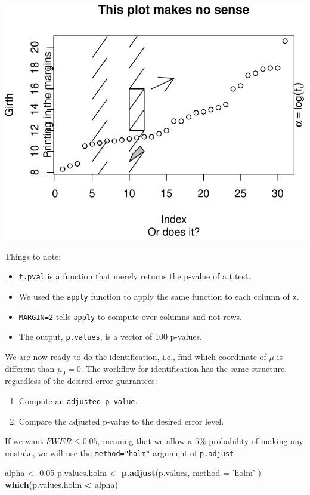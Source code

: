 \documentclass[]{book}
\newenvironment{Shaded}{\begin{snugshade}}{\end{snugshade}}
\newcommand{\KeywordTok}[1]{\textcolor[rgb]{0.13,0.29,0.53}{\textbf{#1}}}
\newcommand{\DataTypeTok}[1]{\textcolor[rgb]{0.13,0.29,0.53}{#1}}
\newcommand{\FloatTok}[1]{\textcolor[rgb]{0.00,0.00,0.81}{#1}}
\newcommand{\StringTok}[1]{\textcolor[rgb]{0.31,0.60,0.02}{#1}}
\newcommand{\OperatorTok}[1]{\textcolor[rgb]{0.81,0.36,0.00}{\textbf{#1}}}
\newcommand{\NormalTok}[1]{#1}
\providecommand{\tightlist}{%
  \setlength{\itemsep}{0pt}\setlength{\parskip}{0pt}}
\theoremstyle{definition}
\theoremstyle{definition}
\theoremstyle{definition}
\theoremstyle{remark}
\begin{document}
\includegraphics[width=0.5\linewidth]{Rcourse_files/figure-latex/unnamed-chunk-212-1}

Things to note:

\begin{itemize}
\tightlist
\item
  \texttt{t.pval} is a function that merely returns the p-value of a
  t.test.
\item
  We used the \texttt{apply} function to apply the same function to each
  column of \texttt{x}.
\item
  \texttt{MARGIN=2} tells \texttt{apply} to compute over columns and not
  rows.
\item
  The output, \texttt{p.values}, is a vector of 100 p-values.
\end{itemize}

We are now ready to do the identification, i.e., find which coordinate
of \(\mu\) is different than \(\mu_0=0\). The workflow for
identification has the same structure, regardless of the desired error
guarantees:

\begin{enumerate}
\def\labelenumi{\arabic{enumi}.}
\tightlist
\item
  Compute an \texttt{adjusted\ p-value}.
\item
  Compare the adjusted p-value to the desired error level.
\end{enumerate}

If we want \(FWER \leq 0.05\), meaning that we allow a \(5\%\)
probability of making any mistake, we will use the
\texttt{method="holm"} argument of \texttt{p.adjust}.

\begin{Shaded}
\begin{Highlighting}[]
\NormalTok{alpha <-}\StringTok{ }\FloatTok{0.05}
\NormalTok{p.values.holm <-}\StringTok{ }\KeywordTok{p.adjust}\NormalTok{(p.values, }\DataTypeTok{method =} \StringTok{'holm'}\NormalTok{ )}
\KeywordTok{which}\NormalTok{(p.values.holm }\OperatorTok{<}\StringTok{ }\NormalTok{alpha)}
\end{Highlighting}
\end{Shaded}
\end{document}
